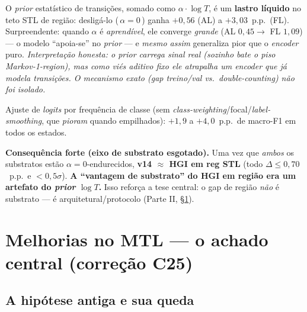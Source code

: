 \documentclass[11pt,a4paper]{article}
\newcommand{\note}[1]{\textcolor{black!55}{\textit{#1}}}
\begin{document}
\begin{description}[leftmargin=1.2em,style=nextline]

\item[\textbf{reg: $\alpha{=}0$ --- desligar o \textit{prior} aditivo $\log T$.}] O \textit{prior}
estatístico de transições, somado como $\alpha\cdot\log T$, é um \textbf{lastro líquido} no teto STL
de região: desligá-lo (\,$\alpha{=}0$\,) ganha $+0{,}56$ (AL) a $+3{,}03$~p.p.\ (FL). Surpreendente:
quando $\alpha$ é \emph{aprendível}, ele converge \emph{grande} (AL $0{,}45 \to$ FL $1{,}09$) --- o
modelo ``apoia-se'' no \textit{prior} --- e \emph{mesmo assim} generaliza pior que o \textit{encoder}
puro. \note{Interpretação honesta: o \textit{prior} carrega sinal real (sozinho bate o piso
Markov-1-region), mas como viés \emph{aditivo} fixo ele atrapalha um \textit{encoder} que já modela
transições. O mecanismo exato (gap treino/val vs.\ \textit{double-counting}) não foi isolado.}

\item[\textbf{cat: \textit{logit-adjustment} $\tau{=}0{,}5$} (Menon, ICLR 2021).] Ajuste de
\textit{logits} por frequência de classe (sem \textit{class-weighting}/focal/\textit{label-smoothing},
que \emph{pioram} quando empilhados): $+1{,}9$ a $+4{,}0$~p.p.\ de macro-F1 em todos os estados.

\end{description}

\noindent\textbf{Consequência forte (eixo de substrato esgotado).} Uma vez que \emph{ambos} os
substratos estão $\alpha{=}0$-endurecidos, \textbf{v14 $\approx$ HGI em reg STL} (todo $\Delta \le
0{,}70$~p.p.\ e $< 0{,}5\sigma$). \textbf{A ``vantagem de substrato'' do HGI em região era um artefato
do \textit{prior} $\log T$.} Isso reforça a tese central: o gap de região \emph{não} é substrato ---
é arquitetural/protocolo (Parte II, \S\ref{sec:mtl}).

\section{Melhorias no MTL --- o achado central (correção C25)}\label{sec:mtl}

\subsection{A hipótese antiga e sua queda}
\end{document}
